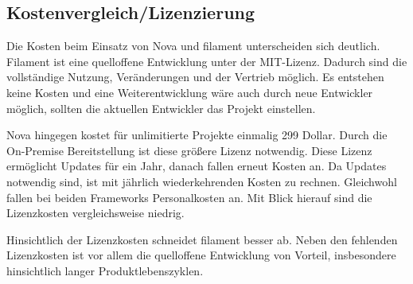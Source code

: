 \subsection{Kostenvergleich/Lizenzierung}
Die Kosten beim Einsatz von Nova und filament unterscheiden sich deutlich.
Filament ist eine quelloffene Entwicklung unter der MIT-Lizenz.
Dadurch sind die vollständige Nutzung, Veränderungen und der Vertrieb möglich.
Es entstehen keine Kosten und eine Weiterentwicklung wäre auch durch neue Entwickler möglich, sollten die aktuellen Entwickler das Projekt einstellen.

Nova hingegen kostet für unlimitierte Projekte einmalig 299 Dollar.
Durch die On-Premise Bereitstellung ist diese größere Lizenz notwendig.
Diese Lizenz ermöglicht Updates für ein Jahr, danach fallen erneut Kosten an.
Da Updates notwendig sind, ist mit jährlich wiederkehrenden Kosten zu rechnen.
Gleichwohl fallen bei beiden Frameworks Personalkosten an.
Mit Blick hierauf sind die Lizenzkosten vergleichsweise niedrig.

Hinsichtlich der Lizenzkosten schneidet filament besser ab.
Neben den fehlenden Lizenzkosten ist vor allem die quelloffene Entwicklung von Vorteil, insbesondere hinsichtlich langer Produktlebenszyklen.
